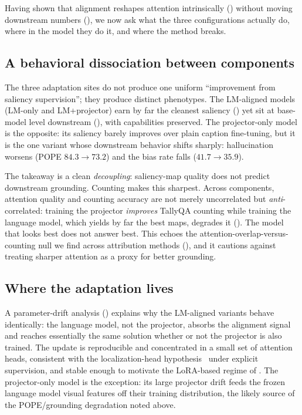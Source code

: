 Having shown that alignment reshapes attention intrinsically () without moving downstream numbers (), we now ask what the three configurations actually do, where in the model they do it, and where the method breaks.

\subsection{A behavioral dissociation between components}
\label{sec:analysis-pheno}
The three adaptation sites do not produce one uniform ``improvement from saliency supervision''; they produce distinct phenotypes. The LM-aligned models (LM-only and LM+projector) earn by far the cleanest saliency () yet sit at base-model level downstream (), with capabilities preserved. The projector-only model is the opposite: its saliency barely improves over plain caption fine-tuning, but it is the one variant whose downstream behavior shifts sharply: hallucination worsens (POPE $84.3\!\to\!73.2$) and the bias rate falls ($41.7\!\to\!35.9$).

The takeaway is a clean \emph{decoupling}: saliency-map quality does not predict downstream grounding. Counting makes this sharpest. Across components, attention quality and counting accuracy are not merely uncorrelated but \emph{anti}-correlated: training the projector \emph{improves} TallyQA counting while training the language model, which yields by far the best maps, degrades it (). The model that looks best does not answer best. This echoes the attention-overlap-versus-counting null we find across attribution methods (), and it cautions against treating sharper attention as a proxy for better grounding.

\subsection{Where the adaptation lives}
\label{sec:analysis-where}
A parameter-drift analysis () explains why the LM-aligned variants behave identically: the language model, not the projector, absorbs the alignment signal and reaches essentially the same solution whether or not the projector is also trained. The update is reproducible and concentrated in a small set of attention heads, consistent with the localization-head hypothesis~\citep{kang2025your, kim2025interpreting} under explicit supervision, and stable enough to motivate the LoRA-based regime of . The projector-only model is the exception: its large projector drift feeds the frozen language model visual features off their training distribution, the likely source of the POPE/grounding degradation noted above.

